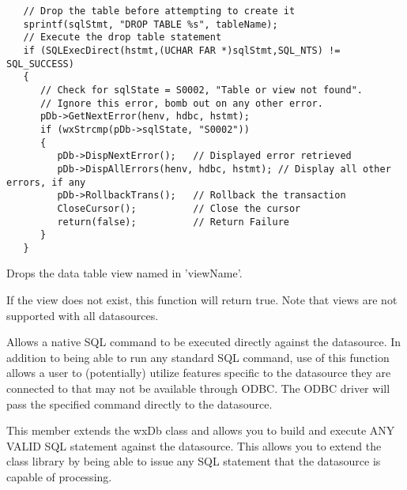 
\begin{verbatim}
   // Drop the table before attempting to create it
   sprintf(sqlStmt, "DROP TABLE %s", tableName);
   // Execute the drop table statement
   if (SQLExecDirect(hstmt,(UCHAR FAR *)sqlStmt,SQL_NTS) != SQL_SUCCESS)
   {
      // Check for sqlState = S0002, "Table or view not found".
      // Ignore this error, bomb out on any other error.
      pDb->GetNextError(henv, hdbc, hstmt);
      if (wxStrcmp(pDb->sqlState, "S0002"))
      {
         pDb->DispNextError();   // Displayed error retrieved
         pDb->DispAllErrors(henv, hdbc, hstmt); // Display all other errors, if any
         pDb->RollbackTrans();   // Rollback the transaction
         CloseCursor();          // Close the cursor
         return(false);          // Return Failure
      }
   }
\end{verbatim}


\label{wxdbdropview}


Drops the data table view named in 'viewName'.




If the view does not exist, this function will return true.  Note that views are not supported with all datasources.

\label{wxdbexecsql}


Allows a native SQL command to be executed directly against the datasource.  In addition to being able to run any standard SQL command, use of this function allows a user to (potentially) utilize features specific to the datasource they are connected to that may not be available through ODBC.  The ODBC driver will pass the specified command directly to the datasource.




This member extends the wxDb class and allows you to build and execute ANY VALID
SQL statement against the datasource.  This allows you to extend the class
library by being able to issue any SQL statement that the datasource is capable
of processing.

